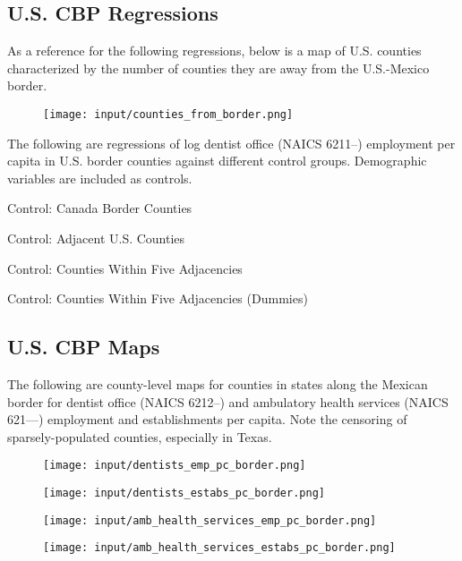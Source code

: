 \subsection{U.S. CBP Regressions}
As a reference for the following regressions, below is a map of U.S. counties characterized by the number of counties they are away from the U.S.-Mexico border.
\begin{figure}[H]
	\centering
	\texttt{[image: input/counties\_from\_border.png]}
\end{figure}

The following are regressions of log dentist office (NAICS 6211--) employment per capita in U.S. border counties against different control groups.
Demographic variables are included as controls.

\begin{table}[H]
	\caption{Control: Canada Border Counties}
	\centering

\end{table}

\begin{table}[H]
	\caption{Control: Adjacent U.S. Counties}
	\centering

\end{table}

\begin{table}[H]
	\caption{Control: Counties Within Five Adjacencies}
	\centering

\end{table}

\begin{table}[H]
	\caption{Control: Counties Within Five Adjacencies (Dummies)}
	\centering

\end{table}

\clearpage
\subsection{U.S. CBP Maps}
The following are county-level maps for counties in states along the Mexican border for dentist office (NAICS 6212--) and ambulatory health services (NAICS 621---) employment and establishments per capita.
Note the censoring of sparsely-populated counties, especially in Texas.

\begin{figure}[H]
	\centering
	\texttt{[image: input/dentists\_emp\_pc\_border.png]}
\end{figure}

\begin{figure}[H]
	\centering
	\texttt{[image: input/dentists\_estabs\_pc\_border.png]}
\end{figure}

\begin{figure}[H]
	\centering
	\texttt{[image: input/amb\_health\_services\_emp\_pc\_border.png]}
\end{figure}

\begin{figure}[H]
	\centering
	\texttt{[image: input/amb\_health\_services\_estabs\_pc\_border.png]}
\end{figure}
